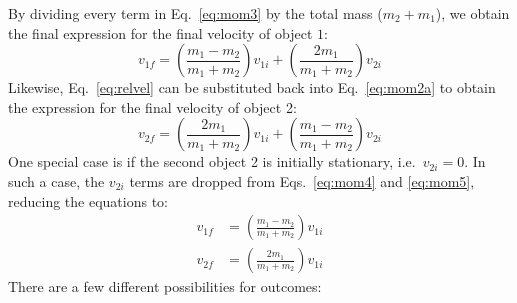 \documentclass{../../oss-handout}
\begin{document}
By dividing every term in Eq.~\ref{eq:mom3} by the total mass ($m_2+m_1$), we 
obtain the final expression for the final velocity of object $1$:
\begin{equation}
  \boxed{
    v_{1f}=
    \left(\frac{m_1-m_2}{m_1+m_2}\right)v_{1i} +
    \left(\frac{2m_1}{m_1+m_2}\right)    v_{2i}
  }
  \label{eq:mom4}
\end{equation}
Likewise, Eq.~\ref{eq:relvel} can be substituted back into Eq.~\ref{eq:mom2a}
to obtain the expression for the final velocity of object 2:
\begin{equation}
  \boxed{
    v_{2f}=
    \left(\frac{2m_1}{m_1+m_2}\right)    v_{1i} +
    \left(\frac{m_1-m_2}{m_1+m_2}\right) v_{2i}
  }
  \label{eq:mom5}
\end{equation}
One special case is if the second object 2 is initially stationary, i.e.\
$v_{2i}=0$. In such a case, the $v_{2i}$ terms are dropped from
Eqs.~\ref{eq:mom4} and \ref{eq:mom5}, reducing the equations to:
\begin{align}
  v_{1f}&=\left(\frac{m_1-m_2}{m_1+m_2}\right)v_{1i}\\
  v_{2f}&=\left(\frac{2m_1}{m_1+m_2}\right)v_{1i}
  \label{eg:simple1}
\end{align}
There are a few different possibilities for outcomes:
\end{document}
